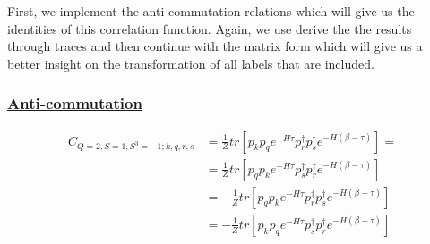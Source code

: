 First, we implement the anti-commutation relations which will give us the identities of this correlation function. Again, we use derive the the results through traces and then continue with the matrix form which will give us a better insight on the transformation of all labels that are included.

\subsubsection{\underline{Anti-commutation}}

\begin{equation}
  \begin{aligned}
    C_{Q=2,S=1,S^3=-1;k,q,r,s} &= \frac{1}{Z}tr\left[p_kp_qe^{-H\tau}p^\dagger_rp^\dagger_se^{-H\left(\beta-\tau\right)}\right] =\\
    &= \frac{1}{Z}tr\left[p_qp_ke^{-H\tau}p^\dagger_sp^\dagger_re^{-H\left(\beta-\tau\right)}\right] \\
    &= - \frac{1}{Z}tr\left[p_qp_ke^{-H\tau}p^\dagger_rp^\dagger_se^{-H\left(\beta-\tau\right)}\right] \\
    &= - \frac{1}{Z}tr\left[p_kp_qe^{-H\tau}p^\dagger_sp^\dagger_re^{-H\left(\beta-\tau\right)}\right]
  \end{aligned}
\end{equation}

